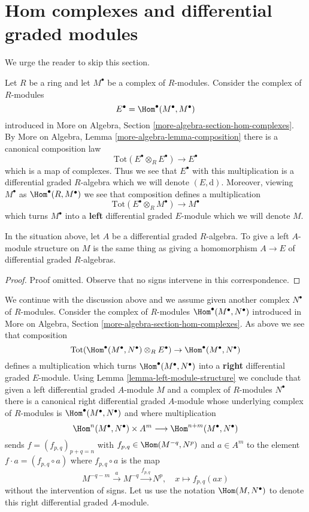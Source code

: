\section{Hom complexes and differential graded modules}
\label{section-hom-complexes}

\noindent
We urge the reader to skip this section.

\medskip\noindent
Let $R$ be a ring and let $M^\bullet$ be a complex of $R$-modules.
Consider the complex of $R$-modules
$$
E^\bullet = \Hom^\bullet(M^\bullet, M^\bullet)
$$
introduced in
More on Algebra, Section \ref{more-algebra-section-hom-complexes}.
By More on Algebra, Lemma \ref{more-algebra-lemma-composition}
there is a canonical composition law
$$
\text{Tot}(E^\bullet \otimes_R E^\bullet) \to E^\bullet
$$
which is a map of complexes. Thus we see that $E^\bullet$ with this
multiplication is a differential graded $R$-algebra which we will
denote $(E, \text{d})$. Moreover, viewing $M^\bullet$ as
$\Hom^\bullet(R, M^\bullet)$ we see that composition defines a multiplication
$$
\text{Tot}(E^\bullet \otimes_R M^\bullet) \to M^\bullet
$$
which turns $M^\bullet$ into a {\bf left} differential graded $E$-module
which we will denote $M$.

\begin{lemma}
\label{lemma-left-module-structure}
In the situation above, let $A$ be a differential graded $R$-algebra.
To give a left $A$-module structure on $M$ is the same thing as
giving a homomorphism $A \to E$ of differential graded $R$-algebras.
\end{lemma}

\begin{proof}
Proof omitted. Observe that no signs intervene in this correspondence.
\end{proof}

\noindent
We continue with the discussion above and we assume given another
complex $N^\bullet$ of $R$-modules. Consider the complex
of $R$-modules $\Hom^\bullet(M^\bullet, N^\bullet)$ introduced in
More on Algebra, Section \ref{more-algebra-section-hom-complexes}.
As above we see that composition
$$
\text{Tot}(\Hom^\bullet(M^\bullet, N^\bullet) \otimes_R E^\bullet)
\to \Hom^\bullet(M^\bullet, N^\bullet)
$$
defines a multiplication which turns $\Hom^\bullet(M^\bullet, N^\bullet)$
into a {\bf right} differential graded $E$-module. Using
Lemma \ref{lemma-left-module-structure} we
conclude that given a left differential graded $A$-module $M$ and
a complex of $R$-modules $N^\bullet$ there is a canonical
right differential graded $A$-module whose underlying complex
of $R$-modules is $\Hom^\bullet(M^\bullet, N^\bullet)$ and
where multiplication
$$
\Hom^n(M^\bullet, N^\bullet) \times A^m \longrightarrow
\Hom^{n + m}(M^\bullet, N^\bullet)
$$
sends $f = (f_{p, q})_{p + q = n}$ with $f_{p, q} \in \Hom(M^{-q}, N^p)$
and $a \in A^m$ to the element $f \cdot a = (f_{p, q} \circ a)$ where
$f_{p, q} \circ a$ is the map
$$
M^{-q - m} \xrightarrow{a} M^{-q} \xrightarrow{f_{p, q}} N^p, \quad
x \longmapsto f_{p, q}(ax)
$$
without the intervention of signs. Let us use the notation
$\Hom(M, N^\bullet)$ to denote this right differential graded $A$-module.

